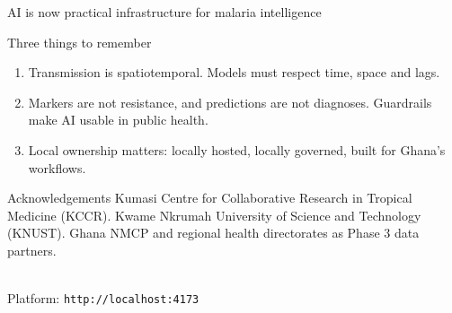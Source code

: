 \documentclass[aspectratio=169,11pt]{beamer}
\begin{document}
\begin{frame}{AI is now practical infrastructure for malaria intelligence}
  \begin{block}{Three things to remember}
    \begin{enumerate}
      \item Transmission is spatiotemporal. Models must respect time, space and lags.
      \item Markers are not resistance, and predictions are not diagnoses. Guardrails make AI usable in public health.
      \item Local ownership matters: locally hosted, locally governed, built for Ghana's workflows.
    \end{enumerate}
  \end{block}
  \vspace{3mm}
  \begin{block}{Acknowledgements}
    Kumasi Centre for Collaborative Research in Tropical Medicine (KCCR).
    Kwame Nkrumah University of Science and Technology (KNUST).
    Ghana NMCP and regional health directorates as Phase 3 data partners.
  \end{block}
  \vfill
  \\[1mm]
  {\scriptsize\textcolor{slate}{Platform: \texttt{http://localhost:4173}}}
\end{frame}
\end{document}
